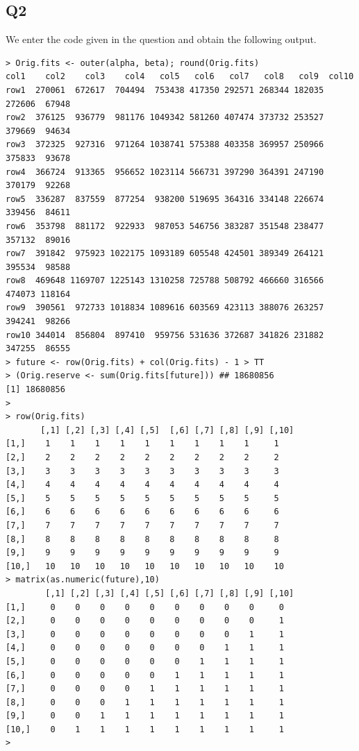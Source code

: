 \documentclass[11pt]{article}
\begin{document}
\subsection*{Q2}

We enter the code given in the question and obtain the following output. 

\begin{verbatim}
> Orig.fits <- outer(alpha, beta); round(Orig.fits)
col1    col2    col3    col4   col5   col6   col7   col8   col9  col10
row1  270061  672617  704494  753438 417350 292571 268344 182035 272606  67948
row2  376125  936779  981176 1049342 581260 407474 373732 253527 379669  94634
row3  372325  927316  971264 1038741 575388 403358 369957 250966 375833  93678
row4  366724  913365  956652 1023114 566731 397290 364391 247190 370179  92268
row5  336287  837559  877254  938200 519695 364316 334148 226674 339456  84611
row6  353798  881172  922933  987053 546756 383287 351548 238477 357132  89016
row7  391842  975923 1022175 1093189 605548 424501 389349 264121 395534  98588
row8  469648 1169707 1225143 1310258 725788 508792 466660 316566 474073 118164
row9  390561  972733 1018834 1089616 603569 423113 388076 263257 394241  98266
row10 344014  856804  897410  959756 531636 372687 341826 231882 347255  86555
> future <- row(Orig.fits) + col(Orig.fits) - 1 > TT
> (Orig.reserve <- sum(Orig.fits[future])) ## 18680856
[1] 18680856
> 
> row(Orig.fits)
       [,1] [,2] [,3] [,4] [,5]  [,6] [,7] [,8] [,9] [,10]
[1,]    1    1    1    1    1    1    1    1    1     1
[2,]    2    2    2    2    2    2    2    2    2     2
[3,]    3    3    3    3    3    3    3    3    3     3
[4,]    4    4    4    4    4    4    4    4    4     4
[5,]    5    5    5    5    5    5    5    5    5     5
[6,]    6    6    6    6    6    6    6    6    6     6
[7,]    7    7    7    7    7    7    7    7    7     7
[8,]    8    8    8    8    8    8    8    8    8     8
[9,]    9    9    9    9    9    9    9    9    9     9
[10,]   10   10   10   10   10   10   10   10   10    10
> matrix(as.numeric(future),10)
        [,1] [,2] [,3] [,4] [,5] [,6] [,7] [,8] [,9] [,10]
[1,]     0    0    0    0    0    0    0    0    0     0
[2,]     0    0    0    0    0    0    0    0    0     1
[3,]     0    0    0    0    0    0    0    0    1     1
[4,]     0    0    0    0    0    0    0    1    1     1
[5,]     0    0    0    0    0    0    1    1    1     1
[6,]     0    0    0    0    0    1    1    1    1     1
[7,]     0    0    0    0    1    1    1    1    1     1
[8,]     0    0    0    1    1    1    1    1    1     1
[9,]     0    0    1    1    1    1    1    1    1     1
[10,]    0    1    1    1    1    1    1    1    1     1
>
\end{verbatim}
\end{document}
